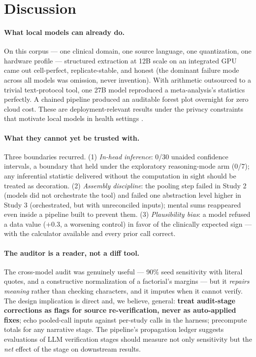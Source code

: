 \documentclass[11pt]{article}
\begin{document}
\section{Discussion}

\paragraph{What local models can already do.} On this corpus --- one clinical domain, one source language, one quantization, one hardware profile --- structured extraction at 12B scale on an integrated GPU came out cell-perfect, replicate-stable, and honest (the dominant failure mode across all models was omission, never invention). With arithmetic outsourced to a trivial text-protocol tool, one 27B model reproduced a meta-analysis's statistics perfectly. A chained pipeline produced an auditable forest plot overnight for zero cloud cost. These are deployment-relevant results under the privacy constraints that motivate local models in health settings \citep{wiest2024privacy,spaanderman2025openweight}.

\paragraph{What they cannot yet be trusted with.} Three boundaries recurred. (1) \emph{In-head inference}: 0/30 unaided confidence intervals, a boundary that held under the exploratory reasoning-mode arm (0/7); any inferential statistic delivered without the computation in sight should be treated as decoration. (2) \emph{Assembly discipline}: the pooling step failed in Study 2 (models did not orchestrate the tool) and failed one abstraction level higher in Study 3 (orchestrated, but with unreconciled inputs); mental sums reappeared even inside a pipeline built to prevent them. (3) \emph{Plausibility bias}: a model refused a data value ($+0.3$, a worsening control) in favor of the clinically expected sign --- with the calculator available and every prior call correct.

\paragraph{The auditor is a reader, not a diff tool.} The cross-model audit was genuinely useful --- 90\% seed sensitivity with literal quotes, and a constructive normalization of a factorial's margins --- but it \emph{repairs meaning} rather than checking characters, and it imputes when it cannot verify. The design implication is direct and, we believe, general: \textbf{treat audit-stage corrections as flags for source re-verification, never as auto-applied fixes}; echo pooled-call inputs against per-study calls in the harness; precompute totals for any narrative stage. The pipeline's propagation ledger suggests evaluations of LLM verification stages should measure not only sensitivity but the \emph{net} effect of the stage on downstream results.
\end{document}
